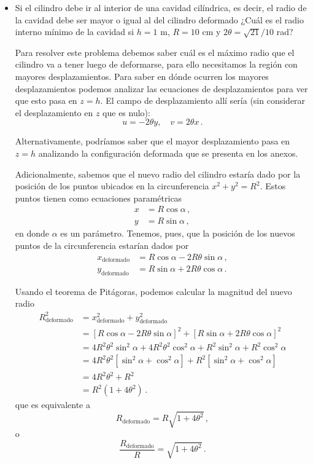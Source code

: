 \documentclass[../notas medios.tex]{subfiles}
\begin{document}
\begin{itemize}
\item
Si el cilindro debe ir al interior de una cavidad cilíndrica, es decir, el 
radio de la cavidad debe ser mayor o igual al del cilindro deformado ¿Cuál es 
el radio interno mínimo de la cavidad si $h=1$ m, $R = 10$ cm y $2\theta = 
\sqrt{21}/10$ rad?


Para resolver este problema debemos saber cuál es el máximo radio que el cilindro va a tener luego de deformarse, para ello necesitamos la región con mayores desplazamientos. Para saber en dónde ocurren los mayores desplazamientos podemos analizar las ecuaciones de desplazamientos para ver que esto pasa en $z=h$. El campo de desplazamiento allí sería (sin considerar el desplazamiento en $z$ que es nulo):
\[u = -2\theta y,\quad v = 2\theta x\, .\]

Alternativamente, podríamos saber que el mayor desplazamiento pasa en $z=h$ analizando la configuración deformada que se presenta en los anexos.

Adicionalmente, sabemos que el nuevo radio del cilindro estaría dado por la posición de los puntos ubicados en la circunferencia $x^2 + y^2 = R^2$. Estos puntos tienen como ecuaciones paramétricas
\begin{align*}
  x &= R \cos\alpha\, ,\\
  y &= R \sin\alpha\, ,
\end{align*}
en donde $\alpha$ es un parámetro. Tenemos, pues, que la posición de los nuevos puntos de la circunferencia estarían dados por
\begin{align*}
  x_\text{deformado} &= R \cos\alpha - 2R\theta \sin\alpha \, ,\\
  y_\text{deformado} &= R \sin\alpha + 2R\theta \cos\alpha\, .
\end{align*}

Usando el teorema de Pitágoras, podemos calcular la magnitud del nuevo radio
\begin{align*}
  R_\text{deformado}^2 &= x_\text{deformado}^2 + y_\text{deformado}^2\\
    &= [R \cos\alpha - 2R\theta \sin\alpha]^2 + [R \sin\alpha + 2R\theta \cos\alpha]^2\\
    &= 4R^2\theta^2\sin^2\alpha + 4R^2\theta^2\cos^2\alpha + R^2\sin^2\alpha + R^2\cos^2\alpha\\
    &= 4R^2\theta^2[\sin^2\alpha + \cos^2\alpha] + R^2[\sin^2\alpha + \cos^2\alpha]\\
    &= 4R^2\theta^2 + R^2\\
    &= R^2 (1 + 4\theta^2)\, .
\end{align*}
que es equivalente a
\[R_\text{deformado} = R\sqrt{1 + 4\theta^2}\, ,\]
o
\[\frac{R_\text{deformado}}{R} = \sqrt{1 + 4\theta^2}\, .\]


\end{itemize}
\end{document}
